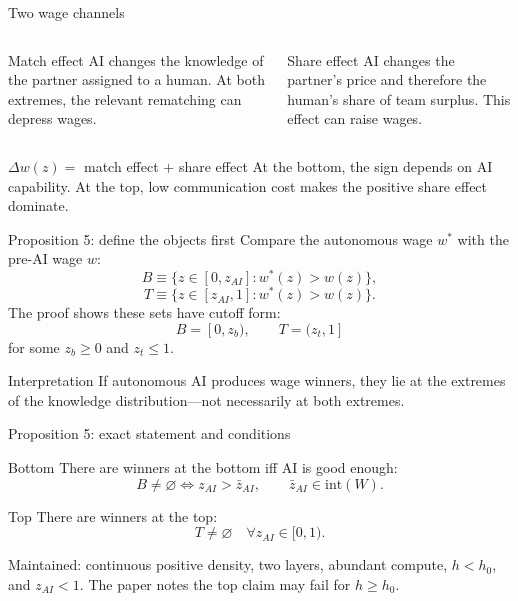 \documentclass[aspectratio=169,10pt]{beamer}
\newcommand{\wpre}{w}
\newcommand{\waut}{w^*}
\begin{document}
\begin{frame}{Two wage channels}
\small
\begin{columns}[T,onlytextwidth]
\begin{alertblock}{Match effect}
AI changes the knowledge of the partner assigned to a human. At both extremes, the relevant rematching can depress wages.
\end{alertblock}
\begin{block}{Share effect}
AI changes the partner's price and therefore the human's share of team surplus. This effect can raise wages.
\end{block}
\end{columns}
\vspace{.3cm}
\centering
\Large $\Delta w(z)=$ \textcolor{IDERed}{match effect} $+$ \textcolor{IDENavy}{share effect}
\vfill
At the bottom, the sign depends on AI capability. At the top, low communication cost makes the positive share effect dominate.
\end{frame}

\begin{frame}{Proposition 5: define the objects first}
\small
Compare the autonomous wage $\waut$ with the pre-AI wage $\wpre$:
\[
B\equiv\{z\in[0,z_{AI}]:\waut(z)>\wpre(z)\},
\]
\[
T\equiv\{z\in[z_{AI},1]:\waut(z)>\wpre(z)\}.
\]
The proof shows these sets have cutoff form:
\[
B=[0,z_b),\qquad T=(z_t,1]
\]
for some $z_b\ge0$ and $z_t\le1$.
\begin{block}{Interpretation}
If autonomous AI produces wage winners, they lie at the extremes of the knowledge distribution—not necessarily at both extremes.
\end{block}
\end{frame}

\begin{frame}{Proposition 5: exact statement and conditions}
\small
\begin{block}{Bottom}
There are winners at the bottom iff AI is good enough:
\[
\boxed{B\ne\varnothing\iff z_{AI}>\bar z_{AI}},
\qquad \bar z_{AI}\in\mathrm{int}(W).
\]
\end{block}
\begin{alertblock}{Top}
There are winners at the top:
\[
\boxed{T\ne\varnothing\quad\forall z_{AI}\in[0,1)}.
\]
\end{alertblock}
Maintained: continuous positive density, two layers, abundant compute, $h<h_0$, and $z_{AI}<1$. The paper notes the top claim may fail for $h\ge h_0$.
\end{frame}
\end{document}
